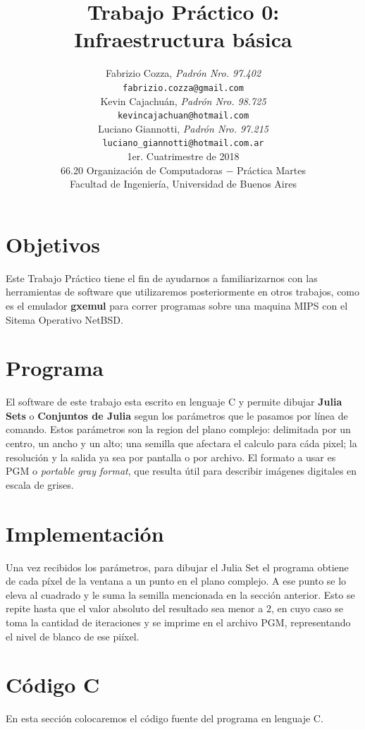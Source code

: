 \documentclass[a4paper,10pt]{article}
\title{		\textbf{Trabajo Pr\'{a}ctico 0: \\
			Infraestructura b\'{a}sica
			}}
\author{	Fabrizio Cozza, \textit{Padr\'{o}n Nro. 97.402}                     \\
            \texttt{ fabrizio.cozza@gmail.com }                                              \\[2.5ex]
            Kevin Cajachu\'{a}n, \textit{Padr\'{o}n Nro. 98.725}                     \\
            \texttt{ kevincajachuan@hotmail.com }                                              \\[2.5ex]
            Luciano Giannotti, \textit{Padr\'{o}n Nro. 97.215}                     \\
            \texttt{luciano\_giannotti@hotmail.com.ar}                                              \\[3.5ex]
	 \newline
            \normalsize{1er. Cuatrimestre de 2018}                                      \\
            \normalsize{66.20 Organizaci\'{o}n de Computadoras  $-$ Pr\'{a}ctica Martes}  \\
            \normalsize{Facultad de Ingenier\'{i}a, Universidad de Buenos Aires}            \\
       }
\date{}
\begin{document}
\maketitle
\thispagestyle{empty}   %
\newpage

\section{Objetivos}

Este Trabajo Pr\'{a}ctico tiene el fin de ayudarnos a familiarizarnos con las herramientas de software que utilizaremos posteriormente en otros trabajos, como es el emulador \textbf{gxemul} para correr programas sobre una maquina MIPS con el Sitema Operativo NetBSD.


\section{Programa}

El software de este trabajo esta escrito en lenguaje C y permite dibujar \textbf{Julia Sets} o \textbf{Conjuntos de Julia} segun los par\'{a}metros que le pasamos por l\'{i}nea de comando.
Estos parámetros son la region del plano complejo: delimitada por un centro, un ancho y un alto; una semilla que afectara el calculo para c\'{a}da pixel; la resoluci\'{o}n y la salida ya sea por pantalla o por archivo.
El formato a usar es  PGM o \textit{portable gray format}, que resulta \'{u}til para describir im\'{a}genes digitales en escala de grises.


\section{Implementaci\'{o}n}

Una vez recibidos los par\'{a}metros, para dibujar el Julia Set el programa obtiene de cada p\'{i}xel de la ventana a un punto en el plano complejo.
A ese punto se lo eleva al cuadrado y le suma la semilla mencionada en la secci\'{o}n anterior. Esto se repite hasta que el valor absoluto del resultado sea menor a 2, en cuyo caso se toma la cantidad de iteraciones y se imprime en el archivo PGM, representando el nivel de blanco de ese pi\'{i}xel.


\section{C\'{o}digo C}

En esta secci\'{o}n colocaremos el c\'{o}digo fuente del programa en lenguaje C.
\end{document}

